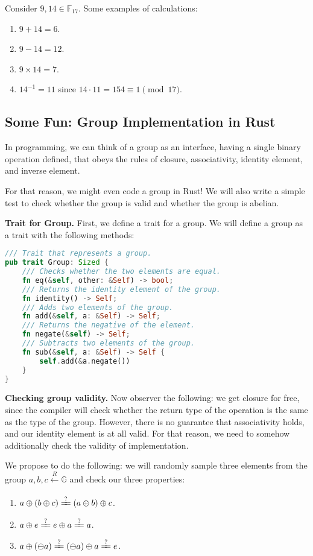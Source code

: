 \documentclass[../lecture-notes-148x210.tex]{subfiles}
\begin{document}
\begin{example}
    Consider $9, 14 \in \mathbb{F}_{17}$. Some examples of calculations:
    \begin{enumerate}
        \item $9+14 = 6$.
        \item $9-14 = 12$.
        \item $9 \times 14 = 7$.
        \item $14^{-1} = 11$ since $14 \cdot 11 = 154 \equiv 1 \pmod{17}$.
    \end{enumerate}
\end{example}

\subsection{Some Fun: Group Implementation in Rust}

In programming, we can think of a group as an interface, having a single binary operation defined, that obeys the rules of closure, associativity, identity element, and inverse element.

For that reason, we might even code a group in Rust! We will also write a simple test to check whether the group is valid and whether the group is abelian.

\textbf{Trait for Group.} First, we define a trait for a group. We will define a group as a trait with the following methods:
\begin{lstlisting}[language=Rust]
/// Trait that represents a group.
pub trait Group: Sized {
    /// Checks whether the two elements are equal.
    fn eq(&self, other: &Self) -> bool;
    /// Returns the identity element of the group.
    fn identity() -> Self;
    /// Adds two elements of the group.
    fn add(&self, a: &Self) -> Self;
    /// Returns the negative of the element.
    fn negate(&self) -> Self;
    /// Subtracts two elements of the group.
    fn sub(&self, a: &Self) -> Self {
        self.add(&a.negate())
    }
}
\end{lstlisting}

\textbf{Checking group validity.} Now observer the following: we get closure for free, since the compiler will check whether the return type of the operation is the same as the type of the group. 
However, there is no guarantee that associativity holds, and our identity element is at all valid. For that reason, we need to somehow additionally check the
validity of implementation.

We propose to do the following: we will randomly sample three elements from the group $a,b,c \xleftarrow[]{R} \mathbb{G}$ and check our three properties:
\begin{enumerate}
    \item $a \oplus (b \oplus c) \xlongequal{?} (a \oplus b) \oplus c$.
    \item $a \oplus e \xlongequal{?} e \oplus a \xlongequal{?} a $.
    \item $a \oplus (\ominus a) \xlongequal{?} (\ominus a) \oplus a \xlongequal{?} e$.
\end{enumerate}
\end{document}
